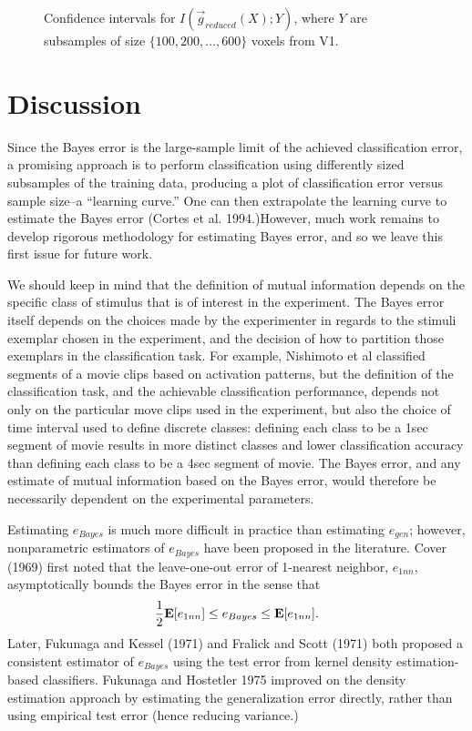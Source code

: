 \documentclass[12pt]{article}
\begin{document}
\begin{figure}
\centering
\caption{Confidence intervals for $I(\vec{g}_{reduced}(X); Y)$, where $Y$ are subsamples of size $\{100, 200, \hdots, 600\}$ voxels
from V1.}
\end{figure}



\section{Discussion}

Since the Bayes error is the large-sample
limit of the achieved classification error, a promising approach is to
perform classification using differently sized subsamples of the
training data, producing a plot of classification error versus sample
size--a ``learning curve.'' One can then extrapolate the learning
curve to estimate the Bayes error (Cortes et al. 1994.)However, much
work remains to develop rigorous methodology for estimating Bayes
error, and so we leave this first issue for future work.

We should keep in mind that the definition
of mutual information depends on the specific class of stimulus that
is of interest in the experiment.  The Bayes error itself depends on
the choices made by the experimenter in regards to the stimuli
exemplar chosen in the experiment, and the decision of how to
partition those exemplars in the classification task.  For example,
Nishimoto et al classified segments of a movie clips based on
activation patterns, but the definition of the classification task,
and the achievable classification performance, depends not only on the
particular move clips used in the experiment, but also the choice of
time interval used to define discrete classes: defining each class to
be a 1sec segment of movie results in more distinct classes and lower
classification accuracy than defining each class to be a 4sec segment
of movie. The Bayes error, and any estimate of mutual information
based on the Bayes error, would therefore be necessarily dependent on
the experimental parameters.


Estimating $e_{Bayes}$ is much more difficult in practice than
estimating $e_{gen}$; however, nonparametric estimators of $e_{Bayes}$
have been proposed in the literature.  Cover (1969) first noted that
the leave-one-out error of 1-nearest neighbor, $e_{1nn}$,
asymptotically bounds the Bayes error in the sense that
\[
\frac{1}{2}\textbf{E}[e_{1nn}] \leq e_{Bayes} \leq \textbf{E}[e_{1nn}].
\]
Later, Fukunaga and Kessel (1971) and Fralick and Scott (1971) both
proposed a consistent estimator of $e_{Bayes}$ using the test error
from kernel density estimation-based classifiers.  Fukunaga and
Hostetler 1975 improved on the density estimation approach by
estimating the generalization error directly, rather than using
empirical test error (hence reducing variance.)
\end{document}
